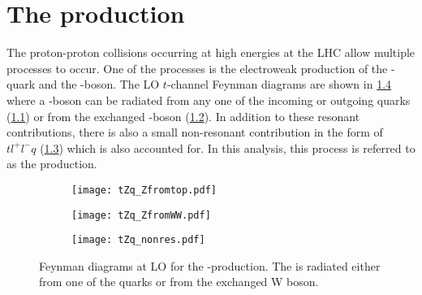 
\chapter{The \tZqsec production}
\label{sec:tZq}

The proton-proton collisions occurring at high energies at the LHC allow 
multiple processes to occur. One of the
processes is the electroweak production of the \Ptop-quark and the 
\PZ-boson. The LO $t$-channel Feynman diagrams are shown in \cref{fig:tZqfeyn} where
a \PZ-boson can be radiated from any one of the incoming or outgoing quarks (\cref{fig:tZqfeyna})
or from the exchanged \PW-boson (\cref{fig:tZqfeynb}). In addition to these
resonant contributions, there is also a small non-resonant contribution 
in the form of $tl^+l^-q$ (\cref{fig:tZqfeync}) which is also accounted for. 
In this analysis, this process
is referred to as the \tZq production. 

\begin{figure}[htbp]
    \centering
    \begin{subfigure}{0.35\figwidth}
      \centering
      \texttt{[image: tZq\_Zfromtop.pdf]}
      \caption{}
      \label{fig:tZqfeyna}
    \end{subfigure}
    \begin{subfigure}{0.35\figwidth}
      \centering
      \texttt{[image: tZq\_ZfromWW.pdf]}
      \caption{}
      \label{fig:tZqfeynb}
    \end{subfigure}
  
  
  \medskip
  
  
  \begin{subfigure}{0.35\figwidth}
      \centering
      \texttt{[image: tZq\_nonres.pdf]}
      \caption{}
         \label{fig:tZqfeync}
    \end{subfigure}
  
  \caption[Feynman diagrams at LO for the \tZq-production]{Feynman diagrams at 
  LO for the \tZq-production. The \PZ is radiated either from one of the
  quarks or from the exchanged W boson. }
  \label{fig:tZqfeyn}
  \end{figure}

